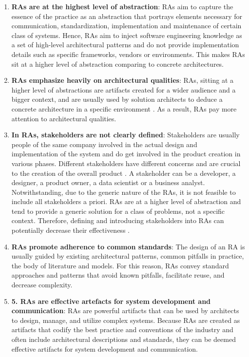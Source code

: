 \documentclass{ieeeaccess}
\begin{document}
\begin{enumerate}
    \item \textbf{RAs are at the highest level of abstraction}: RAs aim to capture the essence of the practice as an abstraction that portrays elements necessary for communication, standardization, implementation and maintenance of certain class of systems. Hence, RAs aim to inject software engineering knowledge as a set of high-level architectural patterns and do not provide implementation details such as specific frameworks, vendors or environments. This makes RAs sit at a higher level of abstraction comparing to concrete architectures.  
   \item \textbf{RAs emphasize heavily on architectural qualities}: RAs, sitting at a higher level of abstractions are artifacts created for a wider audience and a bigger context, and are usually used by solution architects to deduce a concrete architecture in a specific environment \cite{angelov2008towards}\cite{stricker2010creating}. As a result, RAs pay more attention to architectural qualities.
   \item \textbf{In RAs, stakeholders are not clearly defined}: Stakeholders are usually people of the same company involved in the actual design and implementation of the system and do get involved in the product creation in various phases. Different stakeholders have different concerns and are crucial to the creation of the overall product \cite{geerdink2013reference}. A stakeholder can be a developer, a designer, a product owner, a data scientist or a business analyst. Notwithstanding, due to the generic nature of the RAs, it is not feasible to include all stakeholders a priori. RAs are at a higher level of abstraction and tend to provide a generic solution for a class of problems, not a specific context. Therefore, defining and introducing stakeholders into RAs can potentially decrease their effectiveness \cite{AtaeiACIS}\cite{Chang}.
   \item \textbf{RAs promote adherence to common standards}: The design of an RA is usually guided by existing architectural patterns, common pitfalls in practice, the body of literature and models. For this reason, RAs convey standard approaches and patterns that avoid known pitfalls, facilitate reuse, and decrease complexity. 
   \item \textbf{5.	RAs are effective artefacts for system development and communication}: RAs are powerful artifacts that can be used by architects to design, manage, and utilize complex systems. Because RAs are created as artifacts that codify the best practice and conventions of the industry and often include architectural descriptions and standards, they can be deemed effective artifacts for system development and communication. 
\end{enumerate}
\end{document}
